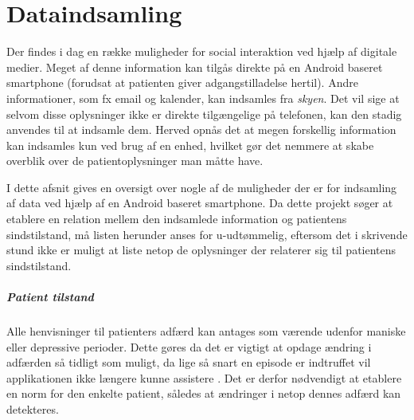 \chapter{Dataindsamling}\label{datasamling}
Der findes i dag en række muligheder for social interaktion ved hjælp af digitale medier.
Meget af denne information kan tilgås direkte på en Android baseret smartphone (forudsat at patienten giver adgangstilladelse hertil).
Andre informationer, som fx email og kalender, kan indsamles fra \textit{skyen}.
Det vil sige at selvom disse oplysninger ikke er direkte tilgængelige på telefonen, kan den stadig anvendes til at indsamle dem.
Herved opnås det at megen forskellig information kan indsamles kun ved brug af en enhed, hvilket gør det nemmere at skabe overblik over de patientoplysninger man måtte have.

I dette afsnit gives en oversigt over nogle af de muligheder der er for indsamling af data ved hjælp af en Android baseret smartphone.
Da dette projekt søger at etablere en relation mellem den indsamlede information og patientens sindstilstand, må listen herunder anses for u-udtømmelig, eftersom det i skrivende stund ikke er muligt at liste netop de oplysninger der relaterer sig til patientens sindstilstand.

\paragraph{Patient tilstand}
Alle henvisninger til patienters adfærd kan antages som værende udenfor maniske eller depressive perioder.
Dette gøres da det er vigtigt at opdage ændring i adfærden så tidligt som muligt, da lige så snart en episode er indtruffet vil applikationen ikke længere kunne assistere .
Det er derfor nødvendigt at etablere en norm for den enkelte patient, således at ændringer i netop dennes adfærd kan detekteres.








